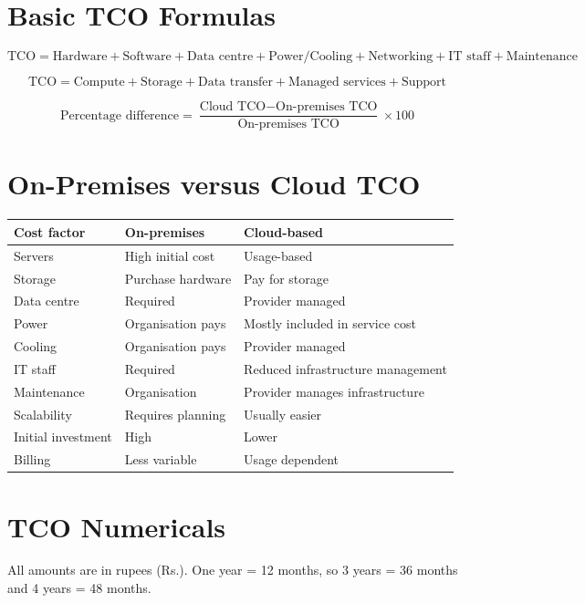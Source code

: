 \documentclass[11pt,a4paper]{article}
\begin{document}
\section{Basic TCO Formulas}

\[
\text{TCO} = \text{Hardware} + \text{Software} + \text{Data centre} +
\text{Power/Cooling} + \text{Networking} + \text{IT staff} + \text{Maintenance}
\]

\[
\text{TCO} = \text{Compute} + \text{Storage} + \text{Data transfer} +
\text{Managed services} + \text{Support}
\]

\[
\text{Percentage difference} = \frac{\text{Cloud TCO} - \text{On-premises TCO}}
{\text{On-premises TCO}} \times 100
\]

\section{On-Premises versus Cloud TCO}

\begin{tabularx}{\textwidth}{@{}lXX@{}}
\toprule
\rowcolor{tablehead}\textbf{Cost factor} & \textbf{On-premises} & \textbf{Cloud-based} \\
\midrule
Servers & High initial cost & Usage-based \\
Storage & Purchase hardware & Pay for storage \\
Data centre & Required & Provider managed \\
Power & Organisation pays & Mostly included in service cost \\
Cooling & Organisation pays & Provider managed \\
IT staff & Required & Reduced infrastructure management \\
Maintenance & Organisation & Provider manages infrastructure \\
Scalability & Requires planning & Usually easier \\
Initial investment & High & Lower \\
Billing & Less variable & Usage dependent \\
\bottomrule
\end{tabularx}

\section{TCO Numericals}

All amounts are in rupees (Rs.). One year = 12 months, so 3 years = 36 months and 4 years =
48 months.
\end{document}
